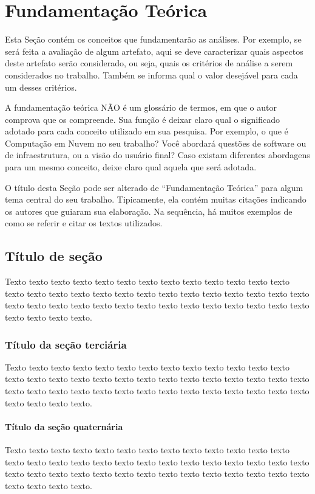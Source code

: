 \chapter{Fundamentação Teórica}
\label{cap:fundamentacao-teorica}

Esta Seção contém os conceitos que fundamentarão as análises. Por exemplo, se será feita a avaliação de algum artefato, aqui se deve caracterizar quais aspectos deste artefato serão considerado, ou seja, quais os critérios de análise a serem considerados no trabalho. Também se informa qual o valor desejável para cada um desses critérios.

A fundamentação teórica NÃO é um glossário de termos, em que o autor comprova que os compreende. Sua função é deixar claro qual o significado adotado para cada conceito utilizado em sua pesquisa. Por exemplo, o que é Computação em Nuvem no seu trabalho? Você abordará questões de software ou de infraestrutura, ou a visão do usuário final? Caso existam diferentes abordagens para um mesmo conceito, deixe claro qual aquela que será adotada. 

O título desta Seção pode ser alterado de “Fundamentação Teórica” para algum tema central do seu trabalho. Tipicamente, ela contém muitas citações indicando os autores que guiaram sua elaboração. Na sequência, há muitos exemplos de como se referir e citar os textos utilizados.


\section{Título de seção }


Texto texto texto texto texto texto texto texto texto texto texto texto texto texto texto texto texto texto texto texto texto texto texto texto texto texto texto texto texto texto texto texto texto texto texto texto texto texto texto texto texto texto texto texto texto.

\subsection{Título da seção terciária}

Texto texto texto texto texto texto texto texto texto texto texto texto texto texto texto texto texto texto texto texto texto texto texto texto texto texto texto texto texto texto texto texto texto texto texto texto texto texto texto texto texto texto texto texto texto.

\subsubsection{Título da seção quaternária}

Texto texto texto texto texto texto texto texto texto texto texto texto texto texto texto texto texto texto texto texto texto texto texto texto texto texto texto texto texto texto texto texto texto texto texto texto texto texto texto texto texto texto texto texto texto.
